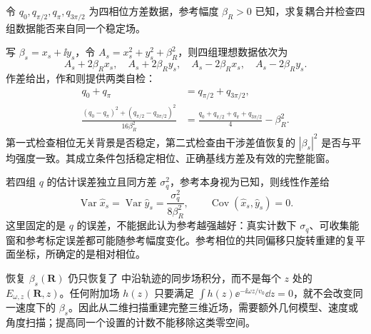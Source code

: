 \begin{exbox}[复近场反演的闭式自检与误差传播]
令 $q_0,q_{\pi/2},q_\pi,q_{3\pi/2}$ 为四相位方差数据，参考幅度 $\beta_R>0$ 已知，求复耦合并检查四组数据能否来自同一个稳定场。

写 $\beta_s=x_s+\ii y_s$，令 $A_s=x_s^2+y_s^2+\beta_R^2$，则四组理想数据依次为
\begin{equation*}
 A_s+2\beta_Rx_s,\quad A_s+2\beta_Ry_s,\quad
 A_s-2\beta_Rx_s,\quad A_s-2\beta_Ry_s.
\end{equation*}
作差给出，作和则提供两类自检：
\begin{align*}
 q_0+q_\pi&=q_{\pi/2}+q_{3\pi/2},\\
 \frac{(q_0-q_\pi)^2+(q_{\pi/2}-q_{3\pi/2})^2}{16\beta_R^2}
 &=\frac{q_0+q_{\pi/2}+q_\pi+q_{3\pi/2}}4-\beta_R^2.
\end{align*}
第一式检查相位无关背景是否稳定，第二式检查由干涉差值恢复的 $|\beta_s|^2$ 是否与平均强度一致。其成立条件包括稳定相位、正确基线方差及有效的完整能窗。

若四组 $q$ 的估计误差独立且同方差 $\sigma_q^2$，参考本身视为已知，则线性作差给
\begin{equation*}
 \operatorname{Var}\widehat x_s=\operatorname{Var}\widehat y_s
 =\frac{\sigma_q^2}{8\beta_R^2},\qquad
 \operatorname{Cov}(\widehat x_s,\widehat y_s)=0.
\end{equation*}
这里固定的是 $q$ 的误差，不能据此认为参考越强越好：真实计数下 $\sigma_q$、可收集能窗和参考标定误差都可能随参考幅度变化。参考相位的共同偏移只旋转重建的复平面坐标，所确定的是相对相位。
\end{exbox}

恢复 $\beta_s(\mathbf R)$ 仍只恢复了 中沿轨迹的同步场积分，而不是每个 $z$ 处的 $E_{\omega,z}(\mathbf R,z)$。任何附加场 $h(z)$ 只要满足 $\int h(z)\ee^{-\ii\omega z/v_0}\dd z=0$，就不会改变同一速度下的 $\beta_s$。因此从二维扫描重建完整三维近场，需要额外几何模型、速度或角度扫描；提高同一个设置的计数不能移除这类零空间。

